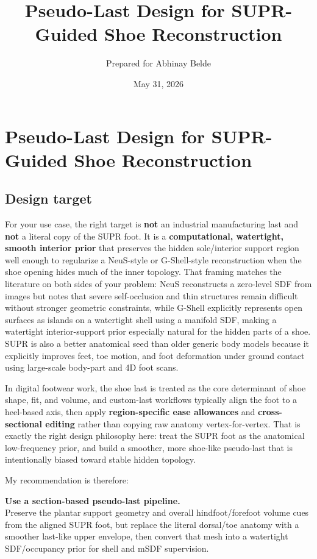 \documentclass[
  10.5pt,
]{article}
\title{Pseudo-Last Design for SUPR-Guided Shoe Reconstruction}
\author{Prepared for Abhinay Belde}
\date{May 31, 2026}
\begin{document}
\maketitle

{
\hypersetup{linkcolor=}
\setcounter{tocdepth}{3}
\tableofcontents
}
\section{Pseudo-Last Design for SUPR-Guided Shoe
Reconstruction}\label{pseudo-last-design-for-supr-guided-shoe-reconstruction}

\subsection{Design target}\label{design-target}

For your use case, the right target is \textbf{not} an industrial
manufacturing last and \textbf{not} a literal copy of the SUPR foot. It
is a \textbf{computational, watertight, smooth interior prior} that
preserves the hidden sole/interior support region well enough to
regularize a NeuS-style or G-Shell-style reconstruction when the shoe
opening hides much of the inner topology. That framing matches the
literature on both sides of your problem: NeuS reconstructs a zero-level
SDF from images but notes that severe self-occlusion and thin structures
remain difficult without stronger geometric constraints, while G-Shell
explicitly represents open surfaces as islands on a watertight shell
using a manifold SDF, making a watertight interior-support prior
especially natural for the hidden parts of a shoe. SUPR is also a better
anatomical seed than older generic body models because it explicitly
improves feet, toe motion, and foot deformation under ground contact
using large-scale body-part and 4D foot scans.

In digital footwear work, the shoe last is treated as the core
determinant of shoe shape, fit, and volume, and custom-last workflows
typically align the foot to a heel-based axis, then apply
\textbf{region-specific ease allowances} and \textbf{cross-sectional
editing} rather than copying raw anatomy vertex-for-vertex. That is
exactly the right design philosophy here: treat the SUPR foot as the
anatomical low-frequency prior, and build a smoother, more shoe-like
pseudo-last that is intentionally biased toward stable hidden topology.

My recommendation is therefore:

\textbf{Use a section-based pseudo-last pipeline.}\\
Preserve the plantar support geometry and overall hindfoot/forefoot
volume cues from the aligned SUPR foot, but replace the literal
dorsal/toe anatomy with a smoother last-like upper envelope, then
convert that mesh into a watertight SDF/occupancy prior for shell and
mSDF supervision.
\end{document}
